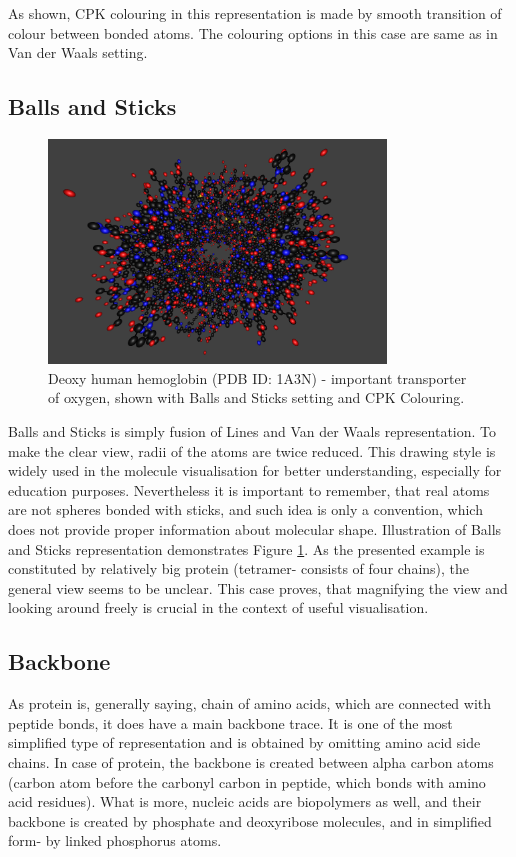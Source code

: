 As shown, CPK colouring in this representation is made by smooth transition of colour between bonded atoms. The colouring options in this case are same as in Van der Waals setting.

\subsection{Balls and Sticks}

\begin{figure}[!htb]
\centering    
\includegraphics[width=0.8\textwidth]{Figs/balls.png}
\caption{Deoxy human hemoglobin (PDB ID: 1A3N) - important transporter of oxygen, shown with Balls and Sticks setting and CPK Colouring.}
\label{fig:balls} 
\end{figure}

Balls and Sticks is simply fusion of Lines and Van der Waals representation. To make the clear view, radii of the atoms are twice reduced. This drawing style is widely used in the molecule visualisation for better understanding, especially for education purposes. Nevertheless it is important to remember, that real atoms are not spheres bonded with sticks, and such idea is only a convention, which does not provide proper information about molecular shape. Illustration of Balls and Sticks representation demonstrates Figure \ref{fig:balls}. As the presented example is constituted by relatively big protein (tetramer- consists of four chains), the general view seems to be unclear. This case proves, that magnifying the view and looking around freely is crucial in the context of useful visualisation.


\subsection{Backbone}

As protein is, generally saying, chain of amino acids, which are connected with peptide bonds, it does have a main backbone trace. It is one of the most simplified type of representation and is obtained by omitting amino acid side chains. In case of protein, the backbone is created between alpha carbon atoms (carbon atom before the carbonyl carbon in peptide, which bonds with amino acid residues). What is more, nucleic acids are biopolymers as well, and their backbone is created by phosphate and deoxyribose molecules, and in simplified form- by linked phosphorus atoms.

